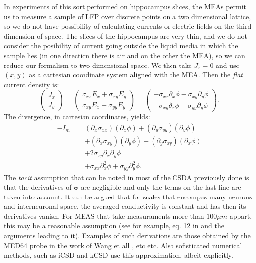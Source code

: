 \documentclass{article}
\newcommand{\cond}{\boldsymbol{\sigma}}
\begin{document}
In experiments of this sort performed on hippocampus slices, the
MEAs permit us to measure a sample of LFP over discrete points on a
two dimensional lattice, so we do not have possibility of
calculating currents or electric fields on the third dimension of space.
The slices of the hippocampus are very thin, and we do not consider
the posibility of current going outside the liquid media in which
the sample lies (in one
direction there is air and on the other the MEA), so we
can reduce our formalism to two dimensional space. We then take
$J_z=0$ and use $(x,y)$ as a cartesian coordinate system aligned
with the MEA. Then the \emph{flat} current density  is:
\begin{equation}
  \begin{pmatrix}
    J_x\\
    J_y
  \end{pmatrix}  =
  \begin{pmatrix}
    \sigma_{xx}E_x+\sigma_{xy}E_y \\
    \sigma_{xy}E_x+\sigma_{yy}E_y 
  \end{pmatrix}=
  \begin{pmatrix}
    -\sigma_{xx}\partial_x \phi -\sigma_{xy}\partial_y \phi \\
    -\sigma_{xy}\partial_x \phi -\sigma_{yy}\partial_y \phi 
  \end{pmatrix}.
\end{equation}
The divergence, in cartesian coordinates, yields:
\begin{equation}\label{Imcart}
  \begin{split}
  -I_m= & (\partial_x \sigma_{xx}) (\partial_x \phi) +
  (\partial_y \sigma_{yy}) (\partial_y \phi)\\
& +(\partial_x \sigma_{xy}) (\partial_y \phi) +(\partial_y \sigma_{xy}) (\partial_x \phi)\\
& + 2\sigma_{xy} \partial_x\partial_y \phi \\
& + \sigma_{xx} \partial_x^2 \phi + \sigma_{yy} \partial_y^2 \phi.
\end{split}
 \end{equation}
The \emph{tacit} assumption that can be noted in most of the CSDA previously
done is that the derivatives of $\cond$ are negligible and only
the terms on the last line are  taken into account. 
It can be argued that for scales that
encompas many neurons and interneuronal space, the averaged conductivity is
constant and has then its derivatives vanish. For MEAS that take measuraments
more than $100 \mu m$ appart, this may be a reasonable assumption (see
for example, eq. 12 in \cite{Bedard11} and the arguments leading to it).
Examples of such derivations are those obtained by the MED64 probe in the
work of Wang et all \cite{Wang10}, etc etc. Also sofisticated
numerical methods, such as iCSD \cite{Pettersen2006, Leski11}
and kCSD \cite{Potworowsky2011} use this approximation, albeit
explicitly. 
\end{document}
